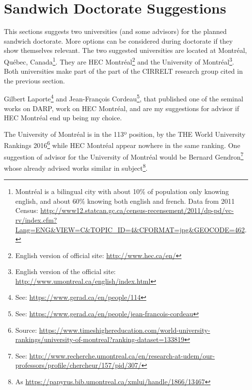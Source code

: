 \documentclass[english,plano-doutorado,twoside]{iiufrgs}
\begin{document}
\iffalse
This section presents some research groups that work with optimization problems related to DARP, or more generally VRP and PDVRP.

\begin{itemize}
\item \textbf{Portuguese group name:} description.
\item \textbf{Portuguese group name:} description.
\item \textbf{Portuguese group name:} description.
\item \textbf{\textit{ENGLISH NAME:}} description. 
\end{itemize}
\fi

\section{Sandwich Doctorate Suggestions}
\label{sec:sandwich}
This sections suggests two universities (and some advisors) for the planned sandwich doctorate. More options can be considered during doctorate if they show themselves relevant. The two suggested universities are located at Montréal, Québec, Canada\footnote{Montréal is a bilingual city with about 10\% of population only knowing english, and about 60\% knowing both english and french. Data from 2011 Census: \url{http://www12.statcan.gc.ca/census-recensement/2011/dp-pd/vc-rv/index.cfm?Lang=ENG&VIEW=C&TOPIC_ID=4&CFORMAT=jpg&GEOCODE=462}.}. They are HEC Montréal\footnote{English version of official site: \url{http://www.hec.ca/en/}} and the University of Montréal\footnote{English version of the official site: \url{http://www.umontreal.ca/english/index.html}}. Both universities make part of the part of the CIRRELT research group cited in the previous section.

Gilbert Laporte\footnote{See: \url{https://www.gerad.ca/en/people/114}} and Jean-François Cordeau\footnote{See: \url{https://www.gerad.ca/en/people/jean-francois-cordeau}}, that published one of the seminal works on DARP\cite{cordeau_dial_ride_2007}, work on HEC Montréal, and are my suggestions for advisor if HEC Montréal end up being my choice.

The University of Montréal is in the 113º position, by the THE World University Rankings 2016\footnote{Source: \url{https://www.timeshighereducation.com/world-university-rankings/university-of-montreal?ranking-dataset=133819}} while HEC Montréal appear nowhere in the same ranking. One suggestion of advisor for the University of Montréal would be Bernard Gendron\footnote{See: \url{http://www.recherche.umontreal.ca/en/research-at-udem/our-professors/profile/chercheur/157/pid/307/}} whose already advised works similar in subject\footnote{As \url{https://papyrus.bib.umontreal.ca/xmlui/handle/1866/13467}}.
\end{document}
